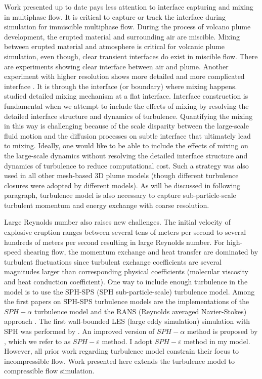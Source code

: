 Work presented up to date pays less attention to interface capturing and mixing in multiphase flow. It is critical to capture or track the interface during simulation for immiscible multiphase flow. During the process of volcano plume development, the erupted material and surrounding air are miscible. Mixing between erupted material and atmosphere is critical for volcanic plume simulation, even though, clear transient interfaces do exist in miscible flow. There are experiments \citep {papantoniou1989large} showing clear interface between air and plume. Another experiment with higher resolution shows more detailed and more complicated interface \cite{crimaldi2001high}. 
It is through the interface (or boundary) where mixing happens. \citet{jacobson2008mixing} studied detailed mixing mechanism at a flat interface. Interface construction is fundamental when we attempt to include the effects of mixing by resolving the detailed interface structure and dynamics of turbulence. Quantifying the mixing in this way is challenging because of the scale disparity between the large-scale fluid motion and the diffusion processes on subtle interface that ultimately lead to mixing. Ideally, one would like to be able to include the effects of mixing on the large-scale dynamics without resolving the detailed interface structure and dynamics of turbulence to reduce computational cost. Such a strategy was also used in all other mesh-based 3D plume models \citep{oberhuber1998volcanic, neri2003multiparticle, suzuki2005numerical, cerminara2016ashee} (though different turbulence closures were adopted by different models). As will be discussed in following paragraph, turbulence model is also necessary to capture sub-particle-scale turbulent momentum and energy exchange with coarse resolution.

Large Reynolds number also raises new challenges.
The initial velocity of explosive eruption ranges between several tens of meters per second to several hundreds of meters per second resulting in large Reynolds number. For high-speed shearing flow, the momentum exchange and heat transfer are dominated by turbulent fluctuations since turbulent exchange coefficients are several magnitudes larger than corresponding physical coefficients (molecular viscosity and heat conduction coefficient). 
One way to include enough turbulence in the model is to use the SPH-SPS (SPH sub-particle-scale) turbulence model.
Among the first papers on SPH-SPS turbulence models are the implementations of the $SPH-\alpha$ turbulence model \citep{holm1999fluctuation, monaghan2002sph} and the RANS (Reynolds averaged Navier-Stokes) approach \citep{violeau2007numerical}. The first wall-bounded LES (large eddy simulation) simulation with SPH was performed by \citet{issa2005numerical}. An improved version of $SPH-\alpha$ method  \citep{monaghan2002sph} is proposed by \citet{monaghan2011turbulence}, which we refer to as $SPH-\varepsilon$ method. I adopt $SPH-\varepsilon$ method in my model. However, all prior work regarding turbulence model constrain their focus to incompressible flow. Work presented here extends the turbulence model to compressible flow simulation.

